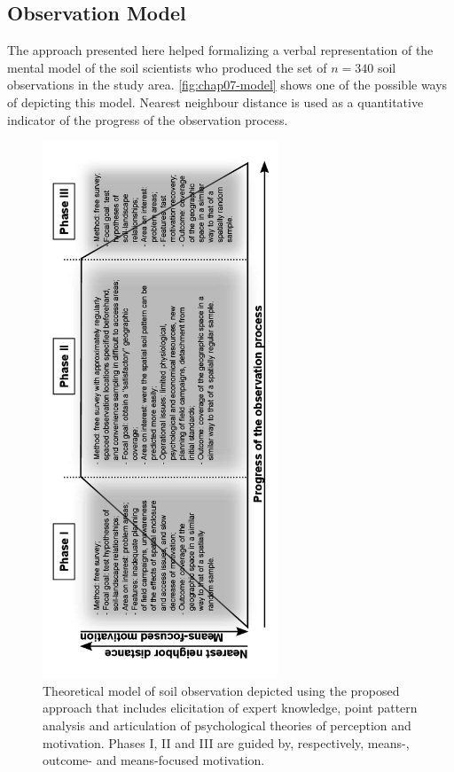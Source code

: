 \subsection{Observation Model}

The approach presented here helped formalizing a verbal representation of the mental model of the soil 
scientists who produced the set of $n = 340$ soil observations in the study area. \autoref{fig:chap07-model} 
shows one of the possible ways of depicting this model. Nearest neighbour distance is used as a quantitative 
indicator of the progress of the observation process.

\begin{figure}[!h]
\centering
\includegraphics[width=70mm, angle=-90]{fig/chap07-observation-model}
 \caption[Theoretical model of soil observation.]{Theoretical model of soil observation depicted using the 
proposed approach that includes elicitation of expert knowledge, point pattern analysis and articulation of 
psychological theories of perception and 
 motivation. Phases I, II and III are guided by, respectively, means-, outcome- and means-focused motivation.}
 \label{fig:chap07-model}
\end{figure}

